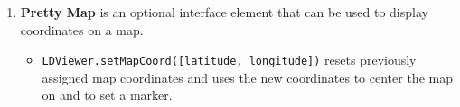\documentclass{book}
\begin{document}
\begin{enumerate}
\item \textbf{Pretty Map} is an optional interface element that can be used to display coordinates on a map.
\begin{itemize}
\item \texttt{LDViewer.setMapCoord([latitude, longitude])} resets previously assigned map coordinates and uses the new coordinates to center the map on and to set a marker.
\end{itemize}
\end{enumerate}
\end{document}
